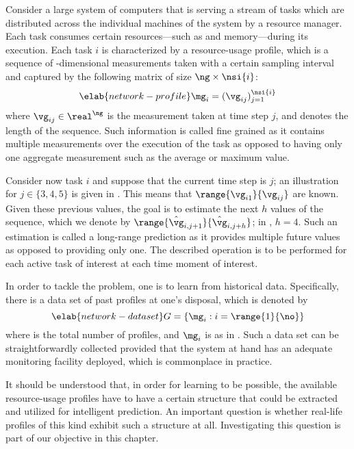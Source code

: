 Consider a large system of computers that is serving a stream of tasks which are
distributed across the individual machines of the system by a resource manager.
Each task consumes certain resources---such as  and memory---during its
execution. Each task $i$ is characterized by a resource-usage profile, which is
a sequence of \ng-dimensional measurements taken with a certain sampling
interval and captured by the following matrix of size $\ng \times \nsi{i}$:
\begin{equation} \elab{network-profile}
  \mg_i = (\vg_{ij})_{j = 1}^\nsi{i}
\end{equation}
where $\vg_{ij} \in \real^\ng$ is the measurement taken at time step $j$, and
 denotes the length of the sequence. Such information is called
fine grained as it contains multiple measurements over the execution of the task
as opposed to having only one aggregate measurement such as the average or
maximum value.

Consider now task $i$ and suppose that the current time step is $j$; an
illustration for $j \in \{3, 4, 5\}$ is given in . This
means that $\range{\vg_{i1}}{\vg_{ij}}$ are known. Given these previous values,
the goal is to estimate the next $h$ values of the sequence, which we denote by
$\range{\hat{\vg}_{i,j + 1}}{\hat{\vg}_{i,j + h}}$; in ,
$h = 4$. Such an estimation is called a long-range prediction as it provides
multiple future values as opposed to providing only one. The described operation
is to be performed for each active task of interest at each time moment of
interest.

In order to tackle the problem, one is to learn from historical data.
Specifically, there is a data set of past profiles at one's disposal, which is
denoted by
\begin{equation} \elab{network-dataset}
  G = \left\{ \mg_i: i = \range{1}{\no} \right\}
\end{equation}
where \no is the total number of profiles, and $\mg_i$ is as in
. Such a data set can be straightforwardly collected
provided that the system at hand has an adequate monitoring facility deployed,
which is commonplace in practice.

It should be understood that, in order for learning to be possible, the
available resource-usage profiles have to have a certain structure that could be
extracted and utilized for intelligent prediction. An important question is
whether real-life profiles of this kind exhibit such a structure at all.
Investigating this question is part of our objective in this chapter.
